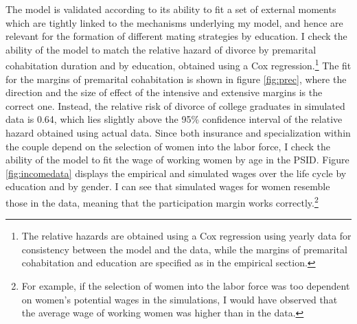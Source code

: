 \documentclass[12pt]{article}
\begin{document}
 The model is validated according to its ability to fit a set of external moments which are tightly linked to the mechanisms underlying my model, and hence are relevant for the formation of different mating strategies by education. I check the ability of the model to match the relative hazard of divorce by premarital cohabitation duration and by education, obtained using a Cox regression.\footnote{The relative hazards are obtained using a Cox regression using yearly data for consistency between the model and the data, while the margins of premarital cohabitation and education are specified as in the empirical section.} The fit for the margins of premarital cohabitation is shown in figure \ref{fig:prec}, where the direction and the size of effect of the intensive and extensive margins is the correct one. Instead, the relative risk of divorce of college graduates in simulated data is 0.64, which lies slightly above the 95\% confidence interval of the relative hazard obtained using actual data. Since both insurance and specialization within the couple depend on the selection of women into the labor force, I check the ability of the model to fit the wage of working women by age in the PSID. Figure \ref{fig:incomedata} displays the empirical and simulated wages over the life cycle by education and by gender. I can see that simulated wages for women resemble those in the data, meaning that the participation margin works correctly.\footnote{For example, if the selection of women into the labor force was too dependent on women's potential wages in the simulations, I would have observed that the average wage of working women was higher than in the data.}
\end{document}
